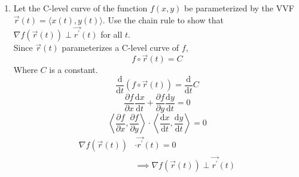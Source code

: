 \begin{enumerate}
	\item Let the C-level curve of the function $f(x,y)$ be parameterized by the VVF $\vec{r}(t) = \langle x(t), y(t) \rangle$. Use the chain rule to show that $\nabla f(\vec{r}(t))\perp\vec{r^\prime}(t)$ for all $t$.\\
	Since $\vec{r}(t)$ parameterizes a C-level curve of $f$,
	\begin{equation*}
		f\circ\vec{r}(t) = C
	\end{equation*}
	Where $C$ is a constant.
	\begin{equation*}
		\frac{\mathrm{d}}{\mathrm{d}t}(f\circ\vec{r}(t)) = \frac{\mathrm{d}}{\mathrm{d}t}C	
	\end{equation*}
	\begin{equation*}
		\frac{\partial f}{\partial x}\frac{\mathrm{d}x}{\mathrm{d}t} + \frac{\partial f}{\partial y}\frac{\mathrm{d}y}{\mathrm{d}t} = 0	
	\end{equation*}
	\begin{equation*}
		\left<\frac{\partial f}{\partial x}, \frac{\partial f}{\partial y}\right> \cdot \left<\frac{\mathrm{d}x}{\mathrm{d}t}, \frac{\mathrm{d}y}{\mathrm{d}t}\right> = 0
	\end{equation*}
	\begin{align*}
		\nabla f(\vec{r}(t)) &\cdot \vec{r^\prime}(t) = 0 \\
		&\implies \nabla f(\vec{r}(t))\perp\vec{r^\prime}(t)	
	\end{align*}
\end{enumerate}